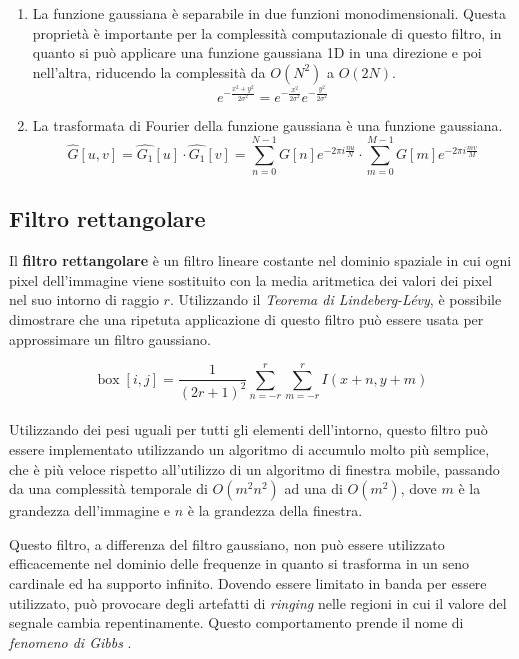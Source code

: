 \documentclass[../main.tex]{subfiles}
\begin{document}
\begin{enumerate}
	\item La funzione gaussiana è separabile in due funzioni monodimensionali. Questa proprietà è importante per la complessità computazionale di questo filtro, in quanto si può applicare una funzione gaussiana 1D in una direzione e poi nell'altra, riducendo la complessità da $O(N^2)$ a $O(2N)$.
	\begin{equation}
		e^{-\frac{x^2+y^2}{2\sigma^2}}=e^{-\frac{x^2}{2\sigma^2}}e^{-\frac{y^2}{2\sigma^2}}
	\end{equation}
	\item La trasformata di Fourier della funzione gaussiana è una funzione gaussiana. 
	\begin{equation}
		\hat{G}[u,v] = \hat{G_1}[u]\cdot\hat{G_1}[v] = \sum_{n=0}^{N-1}G[n]e^{-2\pi i\frac{nu}{N}}\cdot\sum_{m=0}^{M-1}G[m]e^{-2\pi i\frac{mv}{M}}
	\end{equation}
\end{enumerate}

\subsection{Filtro rettangolare}

Il \textbf{filtro rettangolare} è un filtro lineare costante nel dominio spaziale in cui ogni pixel dell'immagine viene sostituito con la media aritmetica dei valori dei pixel nel suo intorno di raggio $r$. Utilizzando il \textit{Teorema di Lindeberg-Lévy}, è possibile dimostrare che una ripetuta applicazione di questo filtro può essere usata per approssimare un filtro gaussiano\cite{getreuer_2013}.

\begin{equation}
	\operatorname{box}[i,j] = \frac{1}{(2r+1)^2}\sum_{n=-r}^{r}\sum_{m=-r}^{r} I(x+n, y+m)
\end{equation}
\\[-10pt]
Utilizzando dei pesi uguali per tutti gli elementi dell'intorno, questo filtro può essere implementato utilizzando un algoritmo di accumulo molto più semplice, che è  più veloce rispetto all'utilizzo di un algoritmo di finestra mobile, passando da una complessità temporale di $O(m^2n^2)$ ad una di $O(m^2)$, dove $m$ è la grandezza dell'immagine e $n$ è la grandezza della finestra.\cite{jarosz_2001}

Questo filtro, a differenza del filtro gaussiano, non può essere utilizzato efficacemente nel dominio delle frequenze in quanto si trasforma in un seno cardinale ed ha supporto infinito. Dovendo essere limitato in banda per essere utilizzato, può provocare degli artefatti di \textit{ringing} nelle regioni in cui il valore del segnale cambia repentinamente. Questo comportamento prende il nome di \textit{fenomeno di Gibbs} \cite{carslaw_1925}.\medskip
\end{document}
